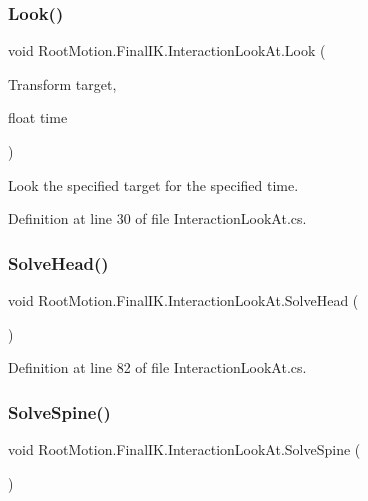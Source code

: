\subsubsection{\texorpdfstring{Look()}{Look()}}
{\footnotesize\ttfamily void Root\+Motion.\+Final\+I\+K.\+Interaction\+Look\+At.\+Look (\begin{DoxyParamCaption}\item[{Transform}]{target,  }\item[{float}]{time }\end{DoxyParamCaption})}



Look the specified target for the specified time. 



Definition at line 30 of file Interaction\+Look\+At.\+cs.

\mbox{\label{class_root_motion_1_1_final_i_k_1_1_interaction_look_at_a6c9407abe73912867e73a1736bd06ad7}} 
\subsubsection{\texorpdfstring{Solve\+Head()}{SolveHead()}}
{\footnotesize\ttfamily void Root\+Motion.\+Final\+I\+K.\+Interaction\+Look\+At.\+Solve\+Head (\begin{DoxyParamCaption}{ }\end{DoxyParamCaption})}



Definition at line 82 of file Interaction\+Look\+At.\+cs.

\mbox{\label{class_root_motion_1_1_final_i_k_1_1_interaction_look_at_a2d6140ebed728175ecf4d148da24d026}} 
\subsubsection{\texorpdfstring{Solve\+Spine()}{SolveSpine()}}
{\footnotesize\ttfamily void Root\+Motion.\+Final\+I\+K.\+Interaction\+Look\+At.\+Solve\+Spine (\begin{DoxyParamCaption}{ }\end{DoxyParamCaption})}



